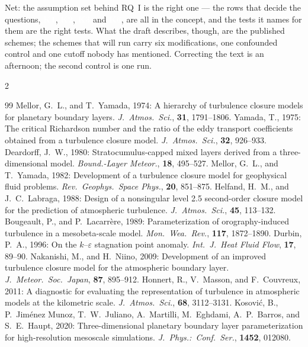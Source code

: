 \documentclass[10pt,a4paper]{article}
\newcommand{\keytag}[1]{\colorbox{keyc}{\textcolor{white}{\sffamily\bfseries\scriptsize K#1}}}
\begin{document}
Net: the assumption set behind RQ~I is the right one — the rows that decide the questions, \keytag{1}, \keytag{2}, \keytag{3} and \keytag{6}, are all in the concept, and the tests it names for them are the right tests. What the draft describes, though, are the published schemes; the schemes that will run carry six modifications, one confounded control and one cutoff nobody has mentioned. Correcting the text is an afternoon; the second control is one run.

\begin{multicols}{2}
\begin{thebibliography}{99}\footnotesize\setlength{\itemsep}{0pt}\setlength{\parskip}{0pt}
 Mellor, G.~L., and T.~Yamada, 1974: A hierarchy of turbulence closure models for planetary boundary layers. \emph{J.~Atmos.~Sci.}, \textbf{31}, 1791--1806.
 Yamada, T., 1975: The critical Richardson number and the ratio of the eddy transport coefficients obtained from a turbulence closure model. \emph{J.~Atmos.~Sci.}, \textbf{32}, 926--933.
 Deardorff, J.~W., 1980: Stratocumulus-capped mixed layers derived from a three-dimensional model. \emph{Bound.-Layer Meteor.}, \textbf{18}, 495--527.
 Mellor, G.~L., and T.~Yamada, 1982: Development of a turbulence closure model for geophysical fluid problems. \emph{Rev.~Geophys.~Space Phys.}, \textbf{20}, 851--875.
 Helfand, H.~M., and J.~C.~Labraga, 1988: Design of a nonsingular level 2.5 second-order closure model for the prediction of atmospheric turbulence. \emph{J.~Atmos.~Sci.}, \textbf{45}, 113--132.
 Bougeault, P., and P.~Lacarrère, 1989: Parameterization of orography-induced turbulence in a mesobeta-scale model. \emph{Mon.~Wea.~Rev.}, \textbf{117}, 1872--1890.
 Durbin, P.~A., 1996: On the $k$--$\varepsilon$ stagnation point anomaly. \emph{Int.~J.~Heat Fluid Flow}, \textbf{17}, 89--90.
 Nakanishi, M., and H.~Niino, 2009: Development of an improved turbulence closure model for the atmospheric boundary layer. \emph{J.~Meteor.~Soc.~Japan}, \textbf{87}, 895--912.
 Honnert, R., V.~Masson, and F.~Couvreux, 2011: A diagnostic for evaluating the representation of turbulence in atmospheric models at the kilometric scale. \emph{J.~Atmos.~Sci.}, \textbf{68}, 3112--3131.
 Kosović, B., P.~Jiménez Munoz, T.~W.~Juliano, A.~Martilli, M.~Eghdami, A.~P.~Barros, and S.~E.~Haupt, 2020: Three-dimensional planetary boundary layer parameterization for high-resolution mesoscale simulations. \emph{J.~Phys.:~Conf.~Ser.}, \textbf{1452}, 012080.

\end{thebibliography}
\end{multicols}
\end{document}
